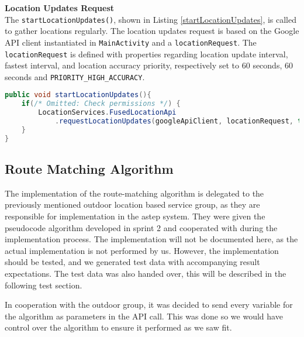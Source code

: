 \textbf{Location Updates Request}\\
The \texttt{startLocationUpdates()}, shown in Listing \ref{startLocationUpdates}, is called to gather locations regularly.
The location updates request is based on the Google API client instantiated in \texttt{MainActivity} and a \texttt{locationRequest}.
The \texttt{locationRequest} is defined with properties regarding location update interval, fastest interval, and location accuracy priority, respectively set to 60 seconds, 60 seconds and \texttt{PRIORITY\_HIGH\_ACCURACY}.

\begin{lstlisting}[language=Java, label=startLocationUpdates, caption=Start location updates functions.]
public void startLocationUpdates(){
	if(/* Omitted: Check permissions */) {
		LocationServices.FusedLocationApi
			.requestLocationUpdates(googleApiClient, locationRequest, this);
	}
}
\end{lstlisting}

\subsection{Route Matching Algorithm}\label{sec:routematchingalgorith}
The implementation of the route-matching algorithm is delegated to the previously mentioned outdoor location based service group, as they are responsible for implementation in the \gls{astep} system.
They were given the pseudocode algorithm developed in sprint 2 and cooperated with during the implementation process.
The implementation will not be documented here, as the actual implementation is not performed by us.
However, the implementation should be tested, and we generated test data with accompanying result expectations.
The test data was also handed over, this will be described in the following test section.

In cooperation with the outdoor group, it was decided to send every variable for the algorithm as parameters in the API call.
This was done so we would have control over the algorithm to ensure it performed as we saw fit.